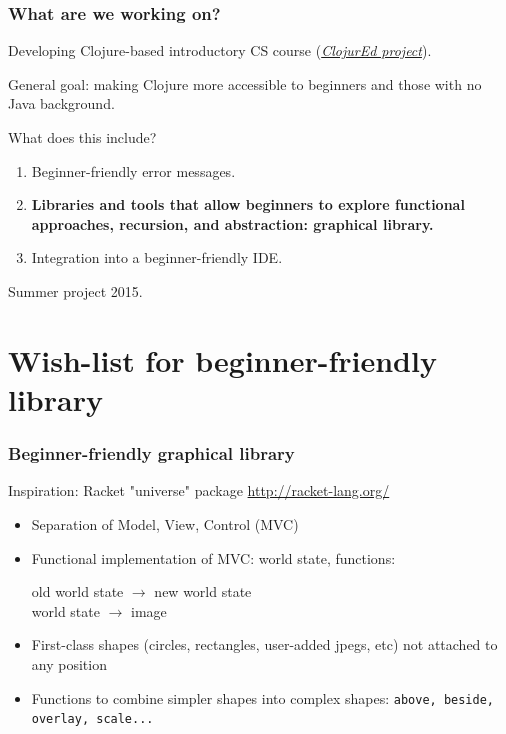 \documentclass{beamer}
\begin{document}
\begin{frame}
\frametitle{What are we working on?}
Developing Clojure-based introductory CS course ({\it \href{http://cda.morris.umn.edu/~elenam/\#clojure}{ClojurEd project}}). 

General goal: making Clojure more accessible to beginners and those with no Java background. 

What does this include? 
\begin{enumerate}
\item Beginner-friendly error messages. 
\item {\bf Libraries and tools that allow beginners to explore functional approaches, recursion, and abstraction: graphical library.}
\item Integration into a beginner-friendly IDE. 
\end{enumerate}
Summer project 2015. 
\end{frame}

\section{Wish-list for beginner-friendly library}

\begin{frame}
\frametitle{Beginner-friendly graphical library}
Inspiration: Racket "universe" package \href{http://racket-lang.org/}{http://racket-lang.org/}
\begin{itemize}
\item Separation of Model, View, Control (MVC) 
\item Functional implementation of MVC: world state, functions: 

\noindent
old world state $\rightarrow$ new world state \\
world state $\rightarrow$ image 
\item  First-class shapes (circles, rectangles, user-added jpegs, etc) not attached to any position
\item Functions to combine simpler shapes into complex shapes: {\tt above, beside, overlay, scale...}
\end{itemize}
\end{frame}
\end{document}
